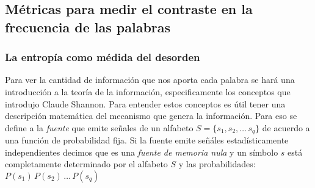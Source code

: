 




\subsection{Métricas para medir el contraste en la frecuencia de las palabras}

\subsubsection{La entropía como médida del desorden}

Para ver la cantidad de información que nos aporta cada palabra se hará una introducción a la teoría de la información, especificamente
los conceptos que introdujo Claude Shannon\cite{shannon2001mathematical}.
Para entender estos conceptos es útil tener una descripción matemática del mecanismo que genera la información. Para eso se define a 
la \textit{fuente} que emite señales de un alfabeto $ S = \{s_1, s_2, \dots\, s_q\}$ de acuerdo a una función de probabilidad fija.
Si la fuente emite señáles estadísticamente independientes decimos que es una \textit{fuente de memoria nula} y un símbolo $s$ está completamente determinado por el alfabeto $S$ y las probabilidades:
$P(s_1)\,P(s_2)\, \dots\, P(s_q)$

